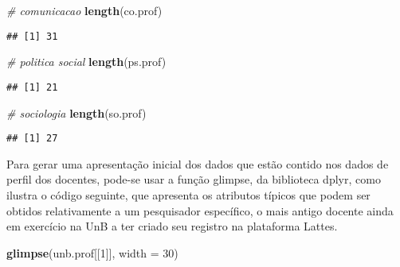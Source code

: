 \documentclass[]{article}
\newenvironment{Shaded}{\begin{snugshade}}{\end{snugshade}}
\newcommand{\KeywordTok}[1]{\textcolor[rgb]{0.13,0.29,0.53}{\textbf{#1}}}
\newcommand{\DataTypeTok}[1]{\textcolor[rgb]{0.13,0.29,0.53}{#1}}
\newcommand{\DecValTok}[1]{\textcolor[rgb]{0.00,0.00,0.81}{#1}}
\newcommand{\CommentTok}[1]{\textcolor[rgb]{0.56,0.35,0.01}{\textit{#1}}}
\newcommand{\NormalTok}[1]{#1}
\begin{document}
\begin{Shaded}
\begin{Highlighting}[]
\CommentTok{# comunicacao}
\KeywordTok{length}\NormalTok{(co.prof)}
\end{Highlighting}
\end{Shaded}

\begin{verbatim}
## [1] 31
\end{verbatim}

\begin{Shaded}
\begin{Highlighting}[]
\CommentTok{# politica social}
\KeywordTok{length}\NormalTok{(ps.prof)}
\end{Highlighting}
\end{Shaded}

\begin{verbatim}
## [1] 21
\end{verbatim}

\begin{Shaded}
\begin{Highlighting}[]
\CommentTok{# sociologia}
\KeywordTok{length}\NormalTok{(so.prof)}
\end{Highlighting}
\end{Shaded}

\begin{verbatim}
## [1] 27
\end{verbatim}

Para gerar uma apresentação inicial dos dados que estão contido nos
dados de perfil dos docentes, pode-se usar a função glimpse, da
biblioteca dplyr, como ilustra o código seguinte, que apresenta os
atributos típicos que podem ser obtidos relativamente a um pesquisador
específico, o mais antigo docente ainda em exercício na UnB a ter criado
seu registro na plataforma Lattes.

\begin{Shaded}
\begin{Highlighting}[]
\KeywordTok{glimpse}\NormalTok{(unb.prof[[}\DecValTok{1}\NormalTok{]], }\DataTypeTok{width =} \DecValTok{30}\NormalTok{)}
\end{Highlighting}
\end{Shaded}
\end{document}
